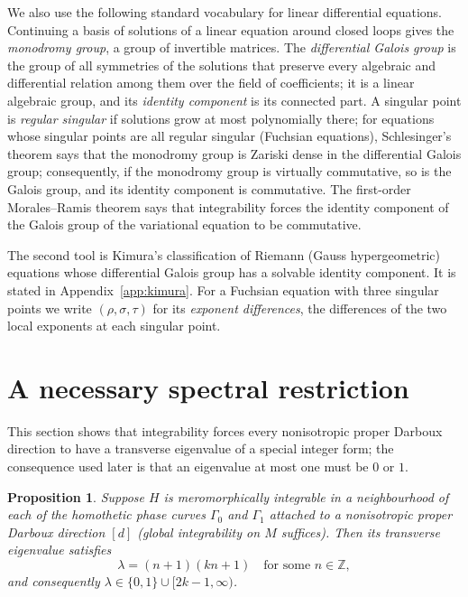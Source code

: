 \documentclass[11pt]{article}
\numberwithin{equation}{section}
\newtheorem{proposition}[theorem]{Proposition}
\theoremstyle{definition}
\theoremstyle{remark}
\newcommand{\Z}{\mathbb Z}
\begin{document}
We also use the following standard vocabulary for linear differential equations. Continuing a basis of solutions
of a linear equation around closed loops gives the \emph{monodromy group}, a group of invertible matrices. The
\emph{differential Galois group} is the group of all symmetries of the solutions that preserve every algebraic and
differential relation among them over the field of coefficients; it is a linear algebraic group, and its
\emph{identity component} is its connected part. A singular point is \emph{regular singular} if solutions grow at most
polynomially there; for equations whose singular points are all regular singular (Fuchsian equations), Schlesinger's
theorem says that the monodromy group is Zariski dense in the differential Galois group; consequently, if the
monodromy group is virtually commutative, so is the Galois group, and its identity component is commutative. The first-order Morales--Ramis theorem \cite[Sec.~1]{MRS07} says that
integrability forces the identity component of the Galois group of the variational equation to be commutative.

The second tool is Kimura's classification \cite{Kimura69} of Riemann (Gauss hypergeometric) equations whose
differential Galois group has a solvable identity component. It is stated in Appendix~\ref{app:kimura}. For a
Fuchsian equation with three singular points we write $(\rho,\sigma,\tau)$ for its \emph{exponent differences}, the
differences of the two local exponents at each singular point.

\section{A necessary spectral restriction}\label{sec:spectral}

This section shows that integrability forces every nonisotropic proper Darboux direction to have a transverse
eigenvalue of a special integer form; the consequence used later is that an eigenvalue at most one must be $0$ or $1$.

\begin{proposition}\label{prop:spectral}
Suppose $H$ is meromorphically integrable in a neighbourhood of each of the homothetic phase curves $\Gamma_0$ and
$\Gamma_1$ attached to a nonisotropic proper Darboux direction $[d]$ (global integrability on $M$ suffices). Then its
transverse eigenvalue satisfies
\begin{equation}\label{eq:spectrum}
\lambda=(n+1)(kn+1)\quad\text{for some }n\in\Z,
\end{equation}
and consequently $\lambda\in\{0,1\}\cup[2k-1,\infty)$.
\end{proposition}
\end{document}

